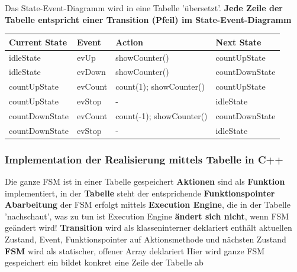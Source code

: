 Das State-Event-Diagramm wird in eine Tabelle 'übersetzt'. \textbf{Jede Zeile der Tabelle entspricht einer Transition (Pfeil) im 
State-Event-Diagramm}

\begin{center}
    \begin{tabular}{llll}
        \toprule
        \textbf{Current State}                  & \textbf{Event}        & \textbf{Action}                   & \textbf{Next State}       \\
        \midrule
        \rowcolor{gray!25} idleState            & evUp                  & showCounter()                     & countUpState              \\
        idleState                               & evDown                & showCounter()                     & countDownState            \\
        \rowcolor{gray!25} countUpState         & evCount               & count(1); showCounter()           & countUpState              \\
        countUpState                            & evStop                & -                                 & idleState                 \\
        \rowcolor{gray!25} countDownState       & evCount               & count(-1); showCounter()          & countDownState            \\
        countDownState                          & evStop                & -                                 & idleState                 \\
        \bottomrule
    \end{tabular}
\end{center}

\columnbreak

\subsubsection{Implementation der Realisierung mittels Tabelle in C++}

\begin{outline}
    \1 Die ganze FSM ist in einer Tabelle gespeichert
    \1 \textbf{Aktionen} sind als \textbf{Funktion} implementiert, in der \textbf{Tabelle} steht der entsprichende \textbf{Funktionspointer} %
    \1 \textbf{Abarbeitung} der FSM erfolgt mittels \textbf{Execution Engine}, die in der Tabelle 'nachschaut', was zu tun ist
        \2 Execution Engine \textbf{ändert sich nicht}, wenn FSM geändert wird!
    \1 \textbf{Transition} wird als klasseninterner  deklariert
        \2 enthält aktuellen Zustand, Event, Funktionspointer auf Aktionsmethode und nächsten Zustand
    \1 \textbf{FSM} wird als statischer, offener Array deklariert
        \2 Hier wird ganze FSM gespeichert
        \2 ein  bildet konkret eine Zeile der Tabelle ab
\end{outline}



